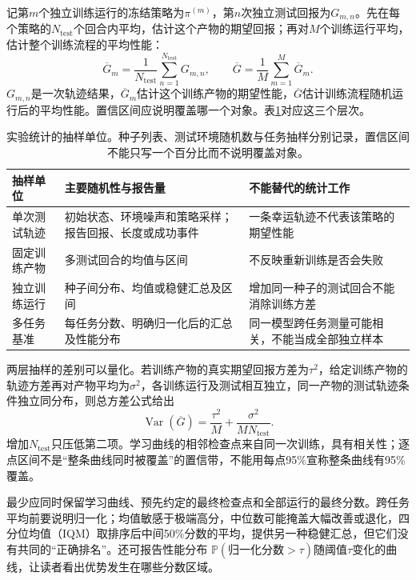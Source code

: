 记第$m$个独立训练运行的冻结策略为$\pi^{(m)}$，第$n$次独立测试回报为$G_{m,n}$。先在每个策略的$N_{\mathrm{test}}$个回合内平均，估计这个产物的期望回报；再对$M$个训练运行平均，估计整个训练流程的平均性能：
\[
 \overline G_m=\frac1{N_{\mathrm{test}}}
                    \sum_{n=1}^{N_{\mathrm{test}}}G_{m,n},\qquad
 \overline G=\frac1M\sum_{m=1}^{M}\overline G_m .
\]
$G_{m,n}$是一次轨迹结果，$\overline G_m$估计这个训练产物的期望性能，$\overline G$估计训练流程随机运行后的平均性能。置信区间应说明覆盖哪一个对象。表\ref{tab:rl-learning-statistical-units}对应这三个层次。

\begin{table}[t]
  \centering
  \small
  \begin{tabularx}{\linewidth}{>{\raggedright\arraybackslash}p{26mm} >{\raggedright\arraybackslash}X >{\raggedright\arraybackslash}X}
    \toprule
    抽样单位 & 主要随机性与报告量 & 不能替代的统计工作 \\
    \midrule
    单次测试轨迹 & 初始状态、环境噪声和策略采样；报告回报、长度或成功事件 & 一条幸运轨迹不代表该策略的期望性能 \\
    固定训练产物 & 多测试回合的均值与区间 & 不反映重新训练是否会失败 \\
    独立训练运行 & 种子间分布、均值或稳健汇总及区间 & 增加同一种子的测试回合不能消除训练方差 \\
    多任务基准 & 每任务分数、明确归一化后的汇总及性能分布 & 同一模型跨任务测量可能相关，不能当成全部独立样本 \\
    \bottomrule
  \end{tabularx}
  \caption{实验统计的抽样单位。种子列表、测试环境随机数与任务抽样分别记录，置信区间不能只写一个百分比而不说明覆盖对象。}
  \label{tab:rl-learning-statistical-units}
\end{table}

两层抽样的差别可以量化。若训练产物的真实期望回报方差为$\tau^2$，给定训练产物的轨迹方差再对产物平均为$\sigma^2$，各训练运行及测试相互独立，同一产物的测试轨迹条件独立同分布，则总方差公式给出
\[
 \operatorname{Var}(\overline G)
   =\frac{\tau^2}{M}
      +\frac{\sigma^2}{M N_{\mathrm{test}}}.
\]
增加$N_{\mathrm{test}}$只压低第二项。学习曲线的相邻检查点来自同一次训练，具有相关性；逐点区间不是“整条曲线同时被覆盖”的置信带，不能用每点95\%宣称整条曲线有95\%覆盖。

最少应同时保留学习曲线、预先约定的最终检查点和全部运行的最终分数。跨任务平均前要说明归一化；均值敏感于极端高分，中位数可能掩盖大幅改善或退化，四分位均值（IQM）取排序后中间50\%分数的平均，提供另一种稳健汇总，但它们没有共同的“正确排名”。还可报告性能分布
$\mathbb P(\text{归一化分数}>\tau)$随阈值$\tau$变化的曲线，让读者看出优势发生在哪些分数区域。

